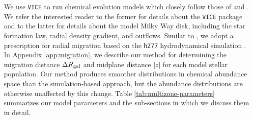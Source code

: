 \documentclass[twocolumn,twocolappendix,linenumbers]{aastex631}
\newcommand{\vice}{{\tt VICE}\xspace}
\newcommand{\hydro}{{\tt h277}\xspace}
\begin{document}
We use \vice to run chemical evolution models which closely follow those of \citet{JohnsonWeinberg2020-Starbursts} and \citet[][hereafter ]{Johnson2021-Migration}. We refer the interested reader to the former for details about the \vice package and to the latter for details about the model Milky Way disk, including the star formation law, radial density gradient, and outflows. Similar to , we adopt a prescription for radial migration based on the \hydro hydrodynamical simulation \citep{Christensen2012-h277}. In Appendix \ref{app:migration}, we describe our method for determining the migration distance $\Delta R_{\rm gal}$ and midplane distance $|z|$ for each model stellar population. Our method produces smoother distributions in chemical abundance space than the simulation-based approach, but the abundance distributions are otherwise unaffected by this change. Table \ref{tab:multizone-parameters} summarizes our model parameters and the sub-sections in which we discuss them in detail.
\end{document}
